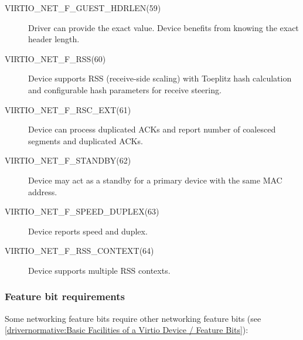 \begin{description}
\item[VIRTIO_NET_F_GUEST_HDRLEN(59)] Driver can provide the exact 
    value. Device benefits from knowing the exact header length.

\item[VIRTIO_NET_F_RSS(60)] Device supports RSS (receive-side scaling)
    with Toeplitz hash calculation and configurable hash
    parameters for receive steering.

\item[VIRTIO_NET_F_RSC_EXT(61)] Device can process duplicated ACKs
    and report number of coalesced segments and duplicated ACKs.

\item[VIRTIO_NET_F_STANDBY(62)] Device may act as a standby for a primary
    device with the same MAC address.

\item[VIRTIO_NET_F_SPEED_DUPLEX(63)] Device reports speed and duplex.

\item[VIRTIO_NET_F_RSS_CONTEXT(64)] Device supports multiple RSS contexts.
\end{description}

\subsubsection{Feature bit requirements}\label{sec:Device Types / Network Device / Feature bits / Feature bit requirements}

Some networking feature bits require other networking feature bits
(see \ref{drivernormative:Basic Facilities of a Virtio Device / Feature Bits}):

